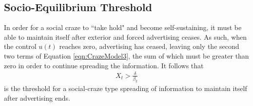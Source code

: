 \subsection{Socio-Equilibrium Threshold}
In order for a social craze to ``take hold" and become self-sustaining, it must be able to maintain itself after exterior and forced advertising ceases. As such, when the control $u(t)$ reaches zero, advertising has ceased, leaving only the second two terms of Equation \ref{eqn:CrazeModel3}, the sum of which must be greater than zero in order to continue spreading the information. It follows that
\begin{equation} \label{eqn:SE_Threshold}
\left.\begin{aligned}
X_t > \frac{\delta}{\beta_2}
\end{aligned}\right.
\end{equation}
\noindent is the threshold for a social-craze type spreading of information to maintain itself after advertising ends.